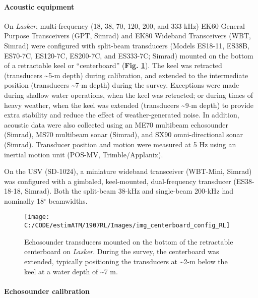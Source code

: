 \documentclass[]{article}
\let\oldparagraph\paragraph
\renewcommand{\paragraph}[1]{\oldparagraph{#1}\mbox{}}
\begin{document}
\hypertarget{methods-acoustic-equipment}{%
\paragraph{Acoustic equipment}\label{methods-acoustic-equipment}}

On \emph{Lasker}, multi-frequency (18, 38, 70, 120, 200, and 333 kHz) EK60 General Purpose Transceivers (GPT, Simrad) and EK80 Wideband Transceivers (WBT, Simrad) were configured with split-beam transducers (Models ES18-11, ES38B, ES70-7C, ES120-7C, ES200-7C, and ES333-7C; Simrad) mounted on the bottom of a retractable keel or ``centerboard'' (\textbf{Fig. \ref{fig:cb-txdrs}}). The keel was retracted (transducers \textasciitilde5-m depth) during calibration, and extended to the intermediate position (transducers \textasciitilde7-m depth) during the survey. Exceptions were made during shallow water operations, when the keel was retracted; or during times of heavy weather, when the keel was extended (transducers \textasciitilde9-m depth) to provide extra stability and reduce the effect of weather-generated noise. In addition, acoustic data were also collected using an ME70 multibeam echosounder (Simrad), MS70 multibeam sonar (Simrad), and SX90 omni-directional sonar (Simrad). Transducer position and motion were measured at 5 Hz using an inertial motion unit (POS-MV, Trimble/Applanix).

On the USV (SD-1024), a miniature wideband transceiver (WBT-Mini, Simrad) was configured with a gimbaled, keel-mounted, dual-frequency transducer (ES38-18-18, Simrad). Both the split-beam 38-kHz and single-beam 200-kHz had nominally 18\(^\circ\) beamwidths.



\begin{figure}[H]

{\centering \texttt{[image: C:/CODE/estimATM/1907RL/Images/img\_centerboard\_config\_RL]} 

}

\caption{Echosounder transducers mounted on the bottom of the retractable centerboard on \emph{Lasker}. During the survey, the centerboard was extended, typically positioning the transducers at \textasciitilde2-m below the keel at a water depth of \textasciitilde7 m.}\label{fig:cb-txdrs}
\end{figure}

\hypertarget{methods-echosounder-calibration}{%
\paragraph{Echosounder calibration}\label{methods-echosounder-calibration}}
\end{document}
